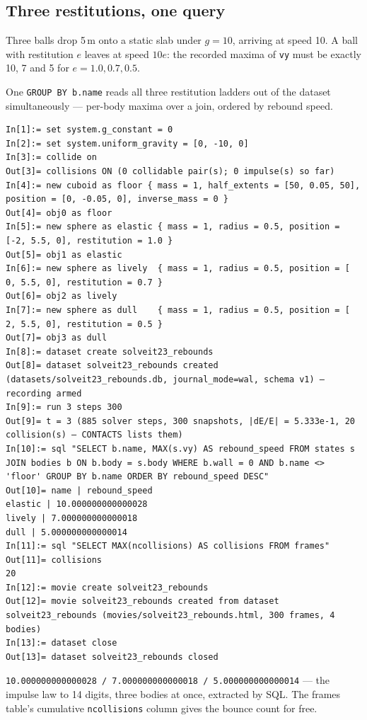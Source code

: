 \documentclass[11pt]{article}
\newcommand{\code}[1]{\texttt{#1}}
\begin{document}
\subsection{Three restitutions, one query}

Three balls drop 5\,m onto a static slab under $g = 10$, arriving at
speed 10. A ball with restitution $e$ leaves at speed $10e$: the
recorded maxima of \code{vy} must be exactly 10, 7 and 5 for
$e = 1.0, 0.7, 0.5$.

One \code{GROUP BY b.name} reads all three restitution ladders out of
the dataset simultaneously --- per-body maxima over a join, ordered by
rebound speed.

\begin{lstlisting}
In[1]:= set system.g_constant = 0
In[2]:= set system.uniform_gravity = [0, -10, 0]
In[3]:= collide on
Out[3]= collisions ON (0 collidable pair(s); 0 impulse(s) so far)
In[4]:= new cuboid as floor { mass = 1, half_extents = [50, 0.05, 50], position = [0, -0.05, 0], inverse_mass = 0 }
Out[4]= obj0 as floor
In[5]:= new sphere as elastic { mass = 1, radius = 0.5, position = [-2, 5.5, 0], restitution = 1.0 }
Out[5]= obj1 as elastic
In[6]:= new sphere as lively  { mass = 1, radius = 0.5, position = [ 0, 5.5, 0], restitution = 0.7 }
Out[6]= obj2 as lively
In[7]:= new sphere as dull    { mass = 1, radius = 0.5, position = [ 2, 5.5, 0], restitution = 0.5 }
Out[7]= obj3 as dull
In[8]:= dataset create solveit23_rebounds
Out[8]= dataset solveit23_rebounds created (datasets/solveit23_rebounds.db, journal_mode=wal, schema v1) — recording armed
In[9]:= run 3 steps 300
Out[9]= t = 3 (885 solver steps, 300 snapshots, |dE/E| = 5.333e-1, 20 collision(s) — CONTACTS lists them)
In[10]:= sql "SELECT b.name, MAX(s.vy) AS rebound_speed FROM states s JOIN bodies b ON b.body = s.body WHERE b.wall = 0 AND b.name <> 'floor' GROUP BY b.name ORDER BY rebound_speed DESC"
Out[10]= name | rebound_speed
elastic | 10.000000000000028
lively | 7.000000000000018
dull | 5.000000000000014
In[11]:= sql "SELECT MAX(ncollisions) AS collisions FROM frames"
Out[11]= collisions
20
In[12]:= movie create solveit23_rebounds
Out[12]= movie solveit23_rebounds created from dataset solveit23_rebounds (movies/solveit23_rebounds.html, 300 frames, 4 bodies)
In[13]:= dataset close
Out[13]= dataset solveit23_rebounds closed
\end{lstlisting}

\code{10.000000000000028 / 7.000000000000018 / 5.000000000000014} ---
the impulse law to 14 digits, three bodies at once, extracted by SQL.
The frames table's cumulative \code{ncollisions} column gives the
bounce count for free.
\end{document}
